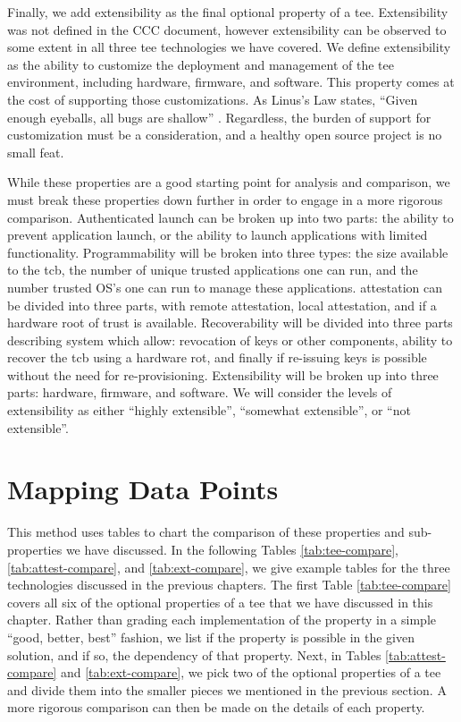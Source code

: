 Finally, we add extensibility as the final optional property of a \gls{tee}. Extensibility was not defined in the CCC document, however extensibility can be observed to some extent in all three \gls{tee} technologies we have covered. We define extensibility as the ability to customize the deployment and management of the \gls{tee} environment, including hardware, firmware, and software. This property comes at the cost of supporting those customizations. As Linus's Law states, ``Given enough eyeballs, all bugs are shallow'' \cite{raymond1999cathedral}. Regardless, the burden of support for customization must be a consideration, and a healthy open source project is no small feat.

While these properties are a good starting point for analysis and comparison, we must break these properties down further in order to engage in a more rigorous comparison. Authenticated launch can be broken up into two parts: the ability to prevent application launch, or the ability to launch applications with limited functionality. Programmability will be broken into three types: the size available to the \gls{tcb}, the number of unique trusted applications one can run, and the number trusted OS's one can run to manage these applications. \Gls{attestation} can be divided into three parts, with remote attestation, local attestation, and if a hardware root of trust is available. Recoverability will be divided into three parts describing system which allow: revocation of keys or other components, ability to recover the \gls{tcb} using a hardware \gls{rot}, and finally if re-issuing keys is possible without the need for re-provisioning. Extensibility will be broken up into three parts: hardware, firmware, and software. We will consider the levels of extensibility as either ``highly extensible'', ``somewhat extensible'', or ``not extensible''.

\section{Mapping Data Points}

This method uses tables to chart the comparison of these properties and sub-properties we have discussed. In the following Tables \ref{tab:tee-compare}, \ref{tab:attest-compare}, and \ref{tab:ext-compare}, we give example tables for the three technologies discussed in the previous chapters. The first Table \ref{tab:tee-compare} covers all six of the optional properties of a \gls{tee} that we have discussed in this chapter. Rather than grading each implementation of the property in a simple ``good, better, best'' fashion, we list if the property is possible in the given solution, and if so,  the dependency of that property. Next, in Tables \ref{tab:attest-compare} and \ref{tab:ext-compare}, we pick two of the optional properties of a \gls{tee} and divide them into the smaller pieces we mentioned in the previous section. A more rigorous comparison can then be made on the details of each property.

